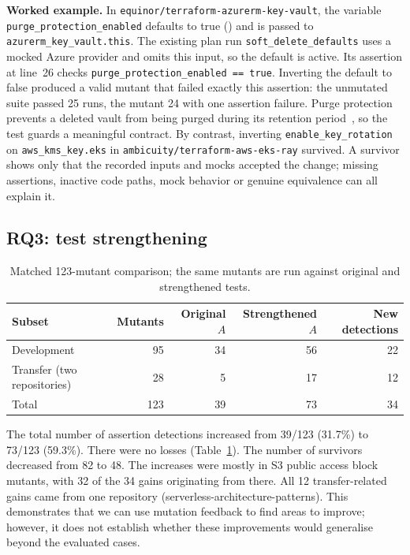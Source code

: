 \documentclass[3p,times,procedia]{elsarticle}
\newcommand{\code}[1]{\texttt{#1}}
\begin{document}
\textbf{Worked example.}\label{sec:workedexample} In \code{equinor/terraform-azurerm-key-vault}, the variable \code{purge\_protection\_enabled} defaults to true () and is passed to \code{azurerm\_key\_vault.this}. The existing plan run \code{soft\_delete\_defaults} uses a mocked Azure provider and omits this input, so the default is active. Its assertion at line~26 checks \code{purge\_protection\_enabled == true}. Inverting the default to false produced a valid mutant that failed exactly this assertion: the unmutated suite passed 25 runs, the mutant 24 with one assertion failure. Purge protection prevents a deleted vault from being purged during its retention period~\cite{azurepurge}, so the test guards a meaningful contract. By contrast, inverting \code{enable\_key\_rotation} on \code{aws\_kms\_key.eks} in \code{ambicuity/terraform-aws-eks-ray} survived. A survivor shows only that the recorded inputs and mocks accepted the change; missing assertions, inactive code paths, mock behavior or genuine equivalence can all explain it.

\subsection{RQ3: test strengthening}\label{sec:pairedresults}
\begin{table}[ht]
\caption{Matched 123-mutant comparison; the same mutants are run against original and strengthened tests.}\label{tab:paired}
\small\begin{tabularx}{\linewidth}{@{}Xrrrr@{}}\toprule
Subset & Mutants & Original $A$ & Strengthened $A$ & New detections\\\midrule
Development & 95 & 34 & 56 & 22\\
Transfer (two repositories) & 28 & 5 & 17 & 12\\\midrule
Total & 123 & 39 & 73 & 34\\\bottomrule
\end{tabularx}\end{table}
The total number of assertion detections increased from 39/123 (31.7\%) to 73/123 (59.3\%). There were no losses (Table~\ref{tab:paired}). The number of survivors decreased from 82 to 48. The increases were mostly in S3 public access block mutants, with 32 of the 34 gains originating from there. All 12 transfer-related gains came from one repository (serverless-architecture-patterns). This demonstrates that we can use mutation feedback to find areas to improve; however, it does not establish whether these improvements would generalise beyond the evaluated cases.
\end{document}
